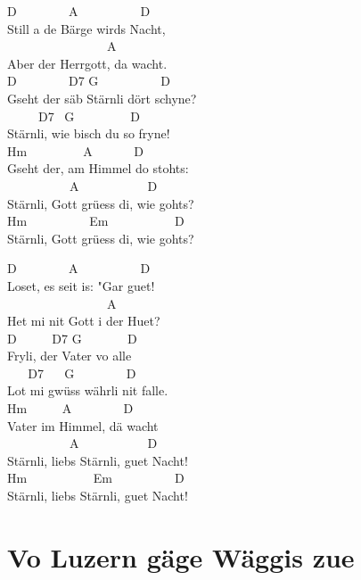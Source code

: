 \documentclass[
  letterpaper,
  twoside=false]{scrbook}
\begin{document}
D ~ ~ ~ ~ ~A ~ ~ ~ ~ ~ ~D\\
Still a de Bärge wird\textquotesingle s Nacht,\\
\hspace*{0.333em} ~ ~ ~ ~ ~ ~ ~ ~ ~ ~A\\
Aber der Herrgott, da wacht.\\
D ~ ~ ~ ~ ~D7 G ~ ~ ~ ~~ ~ D\\
Gseht der säb Stärnli dört schyne?\\
\hspace*{0.333em} ~ ~ ~ D7 ~G ~ ~ ~ ~ ~ D\\
Stärnli, wie bisch du so fryne!\\
Hm ~ ~ ~ ~ ~ A ~ ~ ~ ~D\\
Gseht der, am Himmel do stoht\textquotesingle s:\\
\hspace*{0.333em} ~ ~ ~ ~ ~ ~ A ~ ~~ ~ ~ ~ ~D\\
Stärnli, Gott grüess di, wie goht\textquotesingle s?\\
Hm ~ ~ ~ ~ ~ ~Em ~ ~ ~ ~ ~ ~ D\\
Stärnli, Gott grüess di, wie goht\textquotesingle s?

D ~ ~ ~ ~ ~A ~ ~ ~ ~ ~ ~D\\
Loset, es seit is: "Gar guet!\\
\hspace*{0.333em} ~ ~ ~ ~ ~ ~ ~ ~ ~ ~A\\
Het mi nit Gott i der Huet?\\
D ~ ~ ~ D7 G ~ ~ ~ ~ D\\
Fryli, der Vater vo alle\\
\hspace*{0.333em} ~ ~ D7 ~ ~G ~ ~ ~~ ~ D\\
Lot mi gwüss währli nit falle.\\
Hm ~ ~ ~ A ~ ~ ~ ~ ~D\\
Vater im Himmel, dä wacht\\
\hspace*{0.333em} ~ ~ ~ ~ ~ ~ A ~ ~ ~ ~~ ~ ~D\\
Stärnli, liebs Stärnli, guet Nacht!\\
Hm ~ ~ ~ ~ ~ ~ Em ~ ~ ~ ~~ ~ D\\
Stärnli, liebs Stärnli, guet Nacht!

\hypertarget{vo-luzern-guxe4ge-wuxe4ggis-zue}{%
\chapter{Vo Luzern gäge Wäggis
zue}\label{vo-luzern-guxe4ge-wuxe4ggis-zue}}
\end{document}

